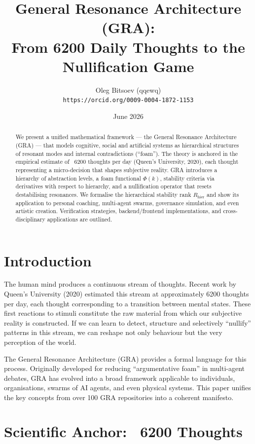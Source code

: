 \documentclass[12pt,a4paper]{article}
\title{General Resonance Architecture (GRA): \\ From 6200 Daily Thoughts to the Nullification Game}
\author{Oleg Bitsoev (qqewq) \\ \texttt{https://orcid.org/0009-0004-1872-1153}}
\date{June 2026}
\begin{document}
\maketitle

\begin{abstract}
We present a unified mathematical framework --- the General Resonance Architecture (GRA) --- that models cognitive, social and artificial systems as hierarchical structures of resonant modes and internal contradictions (``foam''). The theory is anchored in the empirical estimate of ~6200 thoughts per day (Queen's University, 2020), each thought representing a micro-decision that shapes subjective reality. GRA introduces a hierarchy of abstraction levels, a foam functional $\Phi(k)$, stability criteria via derivatives with respect to hierarchy, and a nullification operator that resets destabilising resonances. We formalise the hierarchical stability rank $R_{\text{hier}}$ and show its application to personal coaching, multi-agent swarms, governance simulation, and even artistic creation. Verification strategies, backend/frontend implementations, and cross-disciplinary applications are outlined.
\end{abstract}

\section{Introduction}

The human mind produces a continuous stream of thoughts. Recent work by Queen's University (2020) estimated this stream at approximately 6200 thoughts per day, each thought corresponding to a transition between mental states. These first reactions to stimuli constitute the raw material from which our subjective reality is constructed. If we can learn to detect, structure and selectively ``nullify'' patterns in this stream, we can reshape not only behaviour but the very perception of the world.

The General Resonance Architecture (GRA) provides a formal language for this process. Originally developed for reducing ``argumentative foam'' in multi-agent debates, GRA has evolved into a broad framework applicable to individuals, organisations, swarms of AI agents, and even physical systems. This paper unifies the key concepts from over 100 GRA repositories into a coherent manifesto.

\section{Scientific Anchor: ~6200 Thoughts}
\end{document}
